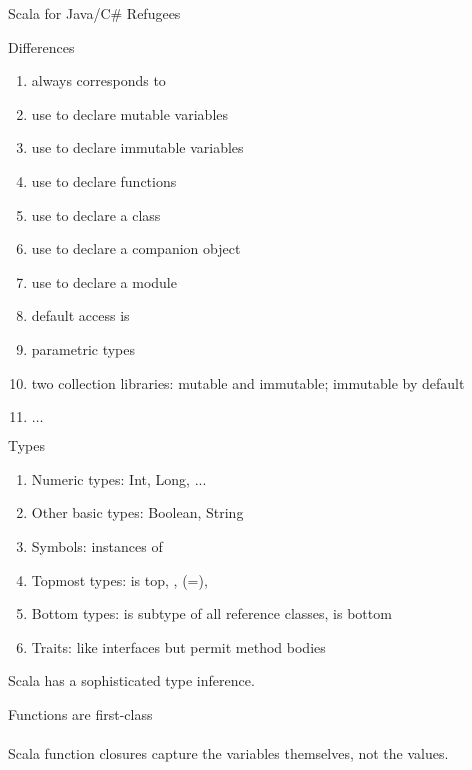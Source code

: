 \documentclass[serif,t,11pt]{beamer}
\begin{document}
\begin{frame}{Scala for Java/C\# Refugees}
\begin{alertblock}{Differences}
\begin{enumerate}
\item \code{==} always corresponds to 
\item use  to declare mutable variables 
\item use  to declare immutable variables
\item use  to declare functions
\item use  to declare a class
\item use  to declare a companion object
\item use  to declare a module
\item default access is 
\item parametric types 
\item two collection libraries: mutable and immutable; immutable by default
\item $\ldots$
\end{enumerate}
\end{alertblock}
\end{frame}

\begin{frame}{Types}
\begin{enumerate}
\item Numeric types: Int, Long, ...
\item Other basic types: Boolean, String
\item Symbols:  instances of 
\item Topmost types:  is top, ,  (=), 
\item Bottom types:  is subtype of all reference classes,  is bottom
\item Traits: like interfaces but permit method bodies
\end{enumerate}

Scala has a sophisticated type inference. %

\begin{block}{Functions are first-class}
\\
\\
Scala function closures capture the variables themselves, not the values.
\end{block}
\end{frame}
\end{document}
